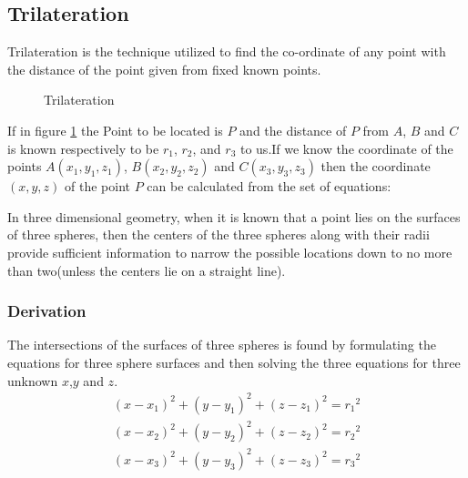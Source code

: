 \subsection{Trilateration}
Trilateration is the technique utilized to find the co-ordinate of any point with the distance of the point given from fixed known points.	

\begin{figure}[htpb]
	\centering
	\caption{Trilateration}
	\label{fig:Trilateration}
\end{figure}

If in figure \ref{fig:Trilateration} the Point to be located is $P$ and the distance of $P$ from $A$, $B$ and $C$ is known respectively to be $r_1$, $r_2$, and $r_3$ to us.If we know the coordinate of the points $A(x_1,y_1,z_1)$, $B(x_2,y_2,z_2)$ and $C(x_3,y_3,z_3)$ then the coordinate $(x,y,z)$ of the point $P$ can be calculated from the set of equations:


In three dimensional geometry, when it is known that a point lies on the surfaces of three spheres, then the centers of the three spheres along with their radii provide sufficient information to narrow the possible locations down to no more than two(unless the centers lie on a straight line).

\subsubsection{Derivation}
The intersections of the surfaces of three spheres is found by formulating the equations for three sphere surfaces and then solving the three equations for three unknown $x$,$y$ and $z$.
\begin{eqnarray}
	\label{equation1} (x-x_1)^2+(y-y_1)^2+(z-z_1)^2={r_1}^2 \\
	\label{equation2} (x-x_2)^2+(y-y_2)^2+(z-z_2)^2={r_2}^2 \\
	\label{equation3} (x-x_3)^2+(y-y_3)^2+(z-z_3)^2={r_3}^2 
\end{eqnarray}

